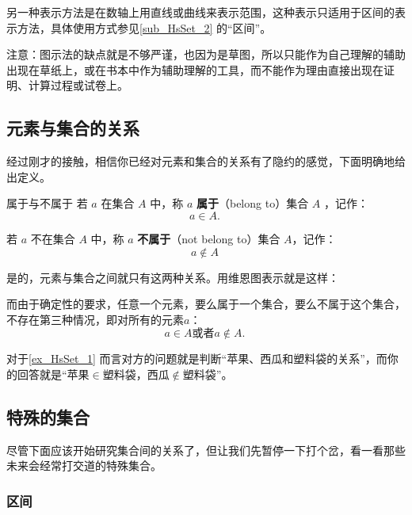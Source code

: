 另一种表示方法是在数轴上用直线或曲线来表示范围，这种表示只适用于区间的表示方法，具体使用方式参见\autoref{sub_HsSet_2} 的“区间”。

注意：图示法的缺点就是不够严谨，也因为是草图，所以只能作为自己理解的辅助出现在草纸上，或在书本中作为辅助理解的工具，而不能作为理由直接出现在证明、计算过程或试卷上。

\subsection{元素与集合的关系}

经过刚才的接触，相信你已经对元素和集合的关系有了隐约的感觉，下面明确地给出定义。

\begin{definition}{属于与不属于}
若 $a$ 在集合 $A$ 中，称 $a$ \textbf{属于}（belong to）集合 $A$ ，记作：
\begin{equation}
a \in A.~
\end{equation}

若 $a$ 不在集合 $A$ 中，称 $a$ \textbf{不属于}（not belong to）集合 $A$，记作：
\begin{equation}
a\notin A~
\end{equation}
\end{definition}
是的，元素与集合之间就只有这两种关系。用维恩图表示就是这样：

而由于确定性的要求，任意一个元素，要么属于一个集合，要么不属于这个集合，不存在第三种情况，即对所有的元素$a$：
\begin{equation}
a\in A\text{或者}a\not\in A.~
\end{equation}

对于\autoref{ex_HsSet_1} 而言对方的问题就是判断“苹果、西瓜和塑料袋的关系”，而你的回答就是“苹果$\in$塑料袋，西瓜$\notin$塑料袋”。

\subsection{特殊的集合}\label{sub_HsSet_2}

尽管下面应该开始研究集合间的关系了，但让我们先暂停一下打个岔，看一看那些未来会经常打交道的特殊集合。

\subsubsection{区间}

